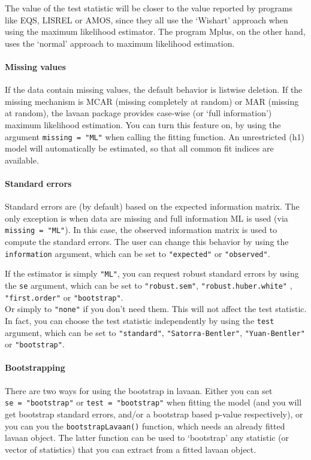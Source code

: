 The value of the test statistic will be closer to the value reported by
programs like EQS, LISREL or AMOS, since they all use the `Wishart'
approach when using the maximum likelihood estimator. The program Mplus,
on the other hand, uses the `normal' approach to maximum likelihood
estimation.

\hypertarget{missing-values}{%
\paragraph{Missing values}\label{missing-values}}

If the data contain missing values, the default behavior is listwise
deletion. If the missing mechanism is MCAR (missing completely at
random) or MAR (missing at random), the lavaan package provides
case-wise (or `full information') maximum likelihood estimation. You can
turn this feature on, by using the argument \texttt{missing\ =\ "ML"}
when calling the fitting function. An unrestricted (h1) model will
automatically be estimated, so that all common fit indices are
available.

\hypertarget{standard-errors}{%
\paragraph{Standard errors}\label{standard-errors}}

Standard errors are (by default) based on the expected information
matrix. The only exception is when data are missing and full information
ML is used (via \texttt{missing\ =\ "ML"}). In this case, the observed
information matrix is used to compute the standard errors. The user can
change this behavior by using the \texttt{information} argument, which
can be set to \texttt{"expected"} or \texttt{"observed"}.

If the estimator is simply \texttt{"ML"}, you can request robust
standard errors by using the \texttt{se} argument, which can be set to
\texttt{"robust.sem"}, \texttt{"robust.huber.white"} ,
\texttt{"first.order"} or \texttt{"bootstrap"}.\\
Or simply to \texttt{"none"} if you don't need them. This will not
affect the test statistic. In fact, you can choose the test statistic
independently by using the \texttt{test} argument, which can be set to
\texttt{"standard"}, \texttt{"Satorra-Bentler"}, \texttt{"Yuan-Bentler"}
or \texttt{"bootstrap"}.

\hypertarget{bootstrapping}{%
\paragraph{Bootstrapping}\label{bootstrapping}}

There are two ways for using the bootstrap in lavaan. Either you can set
\texttt{se\ =\ "bootstrap"} or \texttt{test\ =\ "bootstrap"} when
fitting the model (and you will get bootstrap standard errors, and/or a
bootstrap based p-value respectively), or you can you the
\texttt{bootstrapLavaan()} function, which needs an already fitted
lavaan object. The latter function can be used to `bootstrap' any
statistic (or vector of statistics) that you can extract from a fitted
lavaan object.
